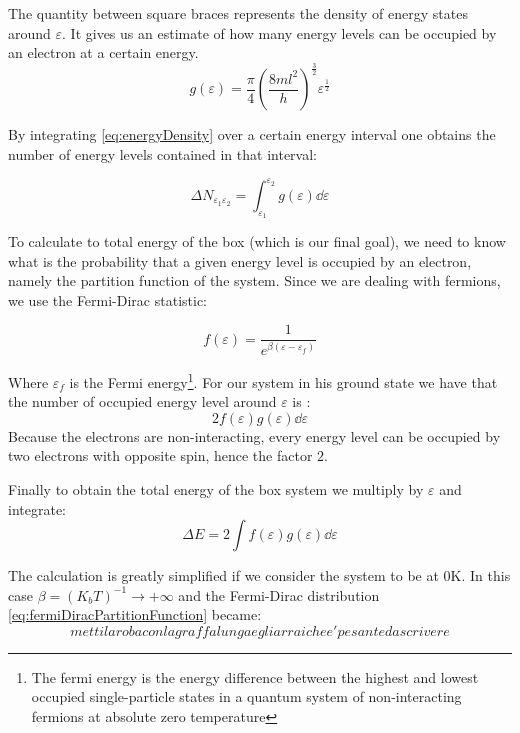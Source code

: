 \documentclass[a4paper,12pt]{article}
\begin{document}
The quantity between square braces represents the density of energy states around $\varepsilon$. 
It gives us an estimate of how many energy levels can be occupied by an electron at a certain energy.
\begin{equation}\label{eq:energyDensity}
	g(\varepsilon) =  \frac{\pi}{4} \left( \frac{8 m l^2}{h} \right)^{\frac{3}{2}} \varepsilon^{\frac{1}{2}}
\end{equation}

By integrating \eqref{eq:energyDensity} over a certain energy interval one obtains the number of energy levels contained in that interval:

\begin{equation}
	\Delta N_{\varepsilon_1 \varepsilon_2} = \int_{\varepsilon_1}^{\varepsilon_2} g(\varepsilon) \dd{\varepsilon}
\end{equation}

To calculate to total energy of the box (which is our final goal), we need to know what is the probability that a given energy level is occupied by an electron, namely the partition function of the system. Since we are dealing with fermions, we use the Fermi-Dirac statistic:

\begin{equation} \label{eq:fermiDiracPartitionFunction}
	f(\varepsilon) = \frac{1}{e^{\beta (\varepsilon - \varepsilon_{f})}}
\end{equation}

Where $\varepsilon_f$ is the Fermi energy\footnote{ The fermi energy is the energy difference between the highest and lowest occupied single-particle states in a quantum system of non-interacting fermions at absolute zero temperature}. 
For our system in his ground state we have that the number of occupied energy level around $\varepsilon$ is :
\begin{equation}
	2 f(\varepsilon) g(\varepsilon) \dd{\varepsilon}
\end{equation}
Because the electrons are non-interacting, every energy level can be occupied by two electrons with opposite spin, hence the factor $2$.

Finally to obtain the total energy of the box system we multiply by $\varepsilon$ and integrate:
\begin{equation}\label{eq:deltaE}
	\Delta E = 2 \int f(\varepsilon) g(\varepsilon) \dd{\varepsilon}
\end{equation}

The calculation is greatly simplified if we consider the system to be at 0K. In this case $\beta = (K_b T)^{-1} \rightarrow + \infty$ and the Fermi-Dirac distribution \eqref{eq:fermiDiracPartitionFunction} became:
\begin{equation}
	metti la roba con la graffa lunga e gli arrai che e' pesante da scrivere
\end{equation}
\end{document}
